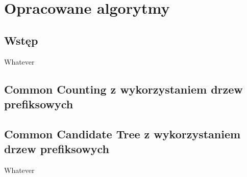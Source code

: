 \chapter{Opracowane algorytmy}
\label{c4}

\section{Wstęp}
\label{c41}

Whatever

\section{Common Counting z wykorzystaniem drzew prefiksowych}
\label{c42}


\section{Common Candidate Tree z wykorzystaniem drzew prefiksowych}
\label{c43}

Whatever